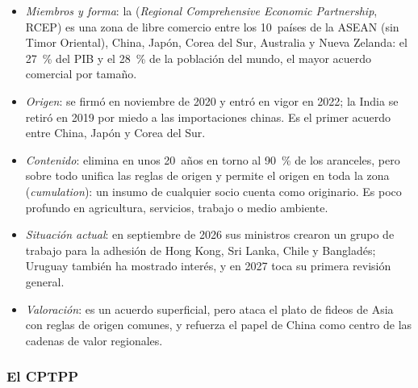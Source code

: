 \documentclass[11pt]{article}
\begin{document}
\begin{itemize}
\item \emph{Miembros y forma}: la  (\emph{Regional Comprehensive Economic Partnership}, RCEP) es una zona de libre comercio entre los 10~países de la ASEAN (sin Timor Oriental), China, Japón, Corea del Sur, Australia y Nueva Zelanda: el 27~\% del PIB y el 28~\% de la población del mundo, el mayor acuerdo comercial por tamaño.
\item \emph{Origen}: se firmó en noviembre de 2020 y entró en vigor en 2022; la India se retiró en 2019 por miedo a las importaciones chinas. Es el primer acuerdo entre China, Japón y Corea del Sur.
\item \emph{Contenido}: elimina en unos 20~años en torno al 90~\% de los aranceles, pero sobre todo unifica las reglas de origen y permite  el origen en toda la zona (\emph{cumulation}): un insumo de cualquier socio cuenta como originario. Es poco profundo en agricultura, servicios, trabajo o medio ambiente.
\item \emph{Situación actual}: en septiembre de 2026 sus ministros crearon un grupo de trabajo para la adhesión de Hong Kong, Sri Lanka, Chile y Bangladés; Uruguay también ha mostrado interés, y en 2027 toca su primera revisión general\nocite{FE2026RCEP}.
\item \emph{Valoración}: es un acuerdo superficial, pero ataca el plato de fideos de Asia con reglas de origen comunes, y refuerza el papel de China como centro de las cadenas de valor regionales.
\end{itemize}

\subsubsection{El CPTPP}\label{sec:cptpp}
\end{document}
